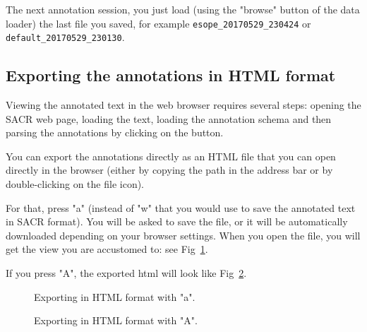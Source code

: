\documentclass[12pt]{article}
\begin{document}
The next annotation session, you just load (using the "browse" button of the
data loader) the last file you saved, for example
\verb|esope_20170529_230424| or \verb|default_20170529_230130|.


 \subsection{Exporting the annotations in HTML format}

Viewing the annotated text in the web browser requires several steps: opening
the SACR web page, loading the text, loading the annotation schema and then
parsing the annotations by clicking on the button.

You can export the annotations directly as an HTML file that you can open
directly in the browser (either by copying the path in the address bar or by
double-clicking on the file icon).

For that, press "a" (instead of "w" that you would use to save the annotated
text in SACR format). You will be asked to save the file, or it will be
automatically downloaded depending on your browser settings.  When you open
the file, you will get the view you are accustomed to: see
Fig~\ref{fig:html-export-1}.

If you press "A", the exported html will look like
Fig~\ref{fig:html-export-2}.

\begin{figure}
\begin{center}
\end{center}
\caption{Exporting in HTML format with "a".}
\label{fig:html-export-1}
\end{figure}


\begin{figure}
\begin{center}
\end{center}
\caption{Exporting in HTML format with "A".}
\label{fig:html-export-2}
\end{figure}
\end{document}
